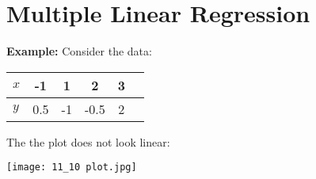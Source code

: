 \section{Multiple Linear Regression}
\textbf{\color{eblue}Example: } Consider the data:
  \begin{center}
    \begin{tabular}{|l|c|c|c|c|c|} 
         \hline
         $x$ & -1 & 1 & 2 & 3\\
         \hline 
         $y$ & 0.5 & -1 & -0.5 & 2\\
         \hline
    \end{tabular}
\end{center}
The the plot does not look linear:
\begin{center}
    \texttt{[image: 11\_10 plot.jpg]}
\end{center}

